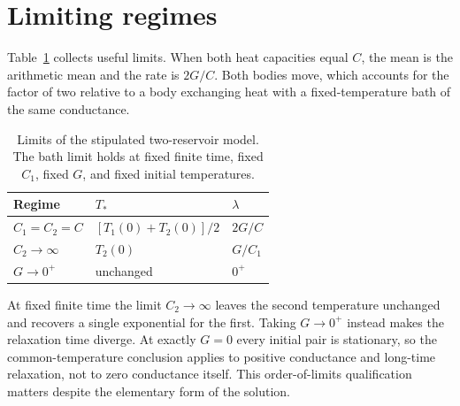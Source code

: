 \section{Limiting regimes}
Table~\ref{tab:limits} collects useful limits. When both heat capacities equal $C$, the mean is the arithmetic mean and the rate is $2G/C$. Both bodies move, which accounts for the factor of two relative to a body exchanging heat with a fixed-temperature bath of the same conductance.

\begin{table}[tb]
\caption{Limits of the stipulated two-reservoir model. The bath limit holds at fixed finite time, fixed $C_1$, fixed $G$, and fixed initial temperatures.}\label{tab:limits}
\begin{tabular}{lll}
\toprule
Regime & $T_*$ & $\lambda$ \\
\midrule
$C_1=C_2=C$ & $[T_1(0)+T_2(0)]/2$ & $2G/C$ \\
$C_2\to\infty$ & $T_2(0)$ & $G/C_1$ \\
$G\to0^+$ & unchanged & $0^+$ \\
\bottomrule
\end{tabular}
\end{table}

At fixed finite time the limit $C_2\to\infty$ leaves the second temperature unchanged and recovers a single exponential for the first. Taking $G\to0^+$ instead makes the relaxation time diverge. At exactly $G=0$ every initial pair is stationary, so the common-temperature conclusion applies to positive conductance and long-time relaxation, not to zero conductance itself. This order-of-limits qualification matters despite the elementary form of the solution.
